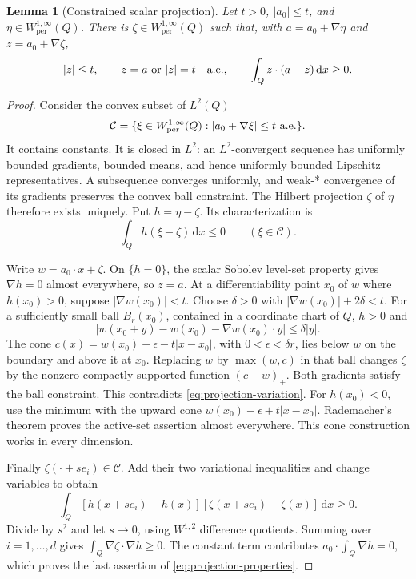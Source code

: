 \documentclass[11pt,a4paper]{article}
\numberwithin{equation}{section}
\newtheorem{lemma}[theorem]{Lemma}
\theoremstyle{definition}
\theoremstyle{remark}\newtheorem{remark}[theorem]{Remark}
\newcommand{\dd}{\,\mathrm dx}
\newcommand{\per}{\mathrm{per}}
\begin{document}
\begin{lemma}[Constrained scalar projection]\label{lem:scalar-projection}
Let \(t>0\), \(|a_0|\leq t\), and \(\eta\in W^{1,\infty}_{\per}(Q)\).
There is \(\zeta\in W^{1,\infty}_{\per}(Q)\) such that, with
\(a=a_0+\nabla\eta\) and \(z=a_0+\nabla\zeta\),
\begin{equation}\label{eq:projection-properties}
 |z|\leq t,\qquad
 z=a\ \hbox{or}\ |z|=t\quad\hbox{a.e.},\qquad
 \int_Q z\cdot(a-z)\dd\geq0.
\end{equation}
\end{lemma}

\begin{proof}
Consider the convex subset of \(L^2(Q)\)
\[
 \mathcal C=\{\xi\in W^{1,\infty}_{\per}(Q):
                         |a_0+\nabla\xi|\leq t\ \hbox{a.e.}\}.
\]
It contains constants. It is closed in \(L^2\): an \(L^2\)-convergent
sequence has uniformly bounded gradients, bounded means, and hence
uniformly bounded Lipschitz representatives. A subsequence converges
uniformly, and weak-* convergence of its gradients preserves the convex
ball constraint. The Hilbert projection \(\zeta\) of \(\eta\) therefore
exists uniquely. Put \(h=\eta-\zeta\). Its characterization is
\begin{equation}\label{eq:projection-variation}
 \int_Qh(\xi-\zeta)\dd\leq0\qquad(\xi\in\mathcal C).
\end{equation}

Write \(w=a_0\cdot x+\zeta\). On \(\{h=0\}\), the scalar Sobolev
level-set property gives \(\nabla h=0\) almost everywhere, so \(z=a\).
At a differentiability point \(x_0\) of \(w\) where \(h(x_0)>0\), suppose
\(|\nabla w(x_0)|<t\). Choose \(\delta>0\) with
\(|\nabla w(x_0)|+2\delta<t\). For a sufficiently small ball
\(B_r(x_0)\), contained in a coordinate chart of \(Q\), \(h>0\) and
\[
 |w(x_0+y)-w(x_0)-\nabla w(x_0)\cdot y|\leq\delta|y|.
\]
The cone \(c(x)=w(x_0)+\epsilon-t|x-x_0|\), with
\(0<\epsilon<\delta r\), lies below \(w\) on the boundary and above it
at \(x_0\). Replacing \(w\) by \(\max(w,c)\) in that ball changes
\(\zeta\) by the nonzero compactly supported function \((c-w)_+\).
Both gradients satisfy the ball constraint. This contradicts
\eqref{eq:projection-variation}. For \(h(x_0)<0\), use the minimum with
the upward cone \(w(x_0)-\epsilon+t|x-x_0|\).
Rademacher's theorem proves the active-set assertion almost everywhere.
This cone construction works in every dimension.

Finally \(\zeta(\cdot\pm se_i)\in\mathcal C\). Add their two
variational inequalities and change variables to obtain
\[
 \int_Q[h(x+se_i)-h(x)]
             [\zeta(x+se_i)-\zeta(x)]\dd\geq0.
\]
Divide by \(s^2\) and let \(s\to0\), using \(W^{1,2}\) difference
quotients. Summing over \(i=1,\ldots,d\) gives
\(\int_Q\nabla\zeta\cdot\nabla h\geq0\).
The constant term contributes \(a_0\cdot\int_Q\nabla h=0\), which proves
the last assertion of \eqref{eq:projection-properties}.
\end{proof}
\end{document}
